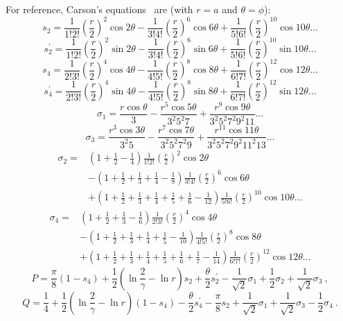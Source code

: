\documentclass[12pt,fleqn]{article}
\begin{document}
For reference, Carson's equations~\cite{Carson} are (with $r = a$ and $\theta = \phi$):
\[
   s_2 = \frac{1}{1!2!} \left(\frac{r}{2}\right)^2 \cos 2\theta
    -\frac{1}{3!4!} \left(\frac{r}{2}\right)^6 \cos 6\theta
    +\frac{1}{5!6!} \left(\frac{r}{2}\right)^{10} \cos 10\theta \ldots
\]
\[
   s_2^\prime = \frac{1}{1!2!} \left(\frac{r}{2}\right)^2 \sin 2\theta
    -\frac{1}{3!4!} \left(\frac{r}{2}\right)^6 \sin 6\theta
    +\frac{1}{5!6!} \left(\frac{r}{2}\right)^{10} \sin 10\theta \ldots
\]
\[
   s_4 = \frac{1}{2!3!} \left(\frac{r}{2}\right)^4 \cos 4\theta
    -\frac{1}{4!5!} \left(\frac{r}{2}\right)^8 \cos 8\theta
    +\frac{1}{6!7!} \left(\frac{r}{2}\right)^{12} \cos 12\theta \ldots
\]
\[
   s_4^\prime = \frac{1}{2!3!} \left(\frac{r}{2}\right)^4 \sin 4\theta
    -\frac{1}{4!5!} \left(\frac{r}{2}\right)^8 \sin 8\theta
    +\frac{1}{6!7!} \left(\frac{r}{2}\right)^{12} \sin 12\theta \ldots
\]
\[
   \sigma_1 = \frac{r \cos\theta}{3} - \frac{r^5 \cos 5\theta}{3^2 5^2 7} + \frac{r^9 \cos 9\theta}{3^2 5^2 7^2 9^2 11} \ldots
\]
\[
   \sigma_3 = \frac{r^3 \cos 3\theta}{3^2 5} - \frac{r^7 \cos 7\theta}{3^2 5^2 7^2 9} + \frac{r^{11} \cos 11\theta}{3^2 5^2 7^2 9^2 11^2 13} \ldots
\]
\begin{align*}
   \sigma_2 = & \left( 1 + \frac{1}{2} - \frac{1}{4}\right) \frac{1}{1! 2!} \left(\frac{r}{2}\right)^2 \cos 2\theta \\
   & - \left( 1 + \frac{1}{2} + \frac{1}{3} + \frac{1}{4} - \frac{1}{8}\right) \frac{1}{3! 4!} \left(\frac{r}{2}\right)^6 \cos 6\theta \\
   & + \left( 1 + \frac{1}{2} + \frac{1}{3} + \frac{1}{4} + \frac{1}{5} + \frac{1}{6} - \frac{1}{12}\right) \frac{1}{5! 6!} \left(\frac{r}{2}\right)^{10} \cos 10\theta \ldots
\end{align*}
\begin{align*}
   \sigma_4 = & \left( 1 + \frac{1}{2} + \frac{1}{3} - \frac{1}{6}\right) \frac{1}{2! 3!} \left(\frac{r}{2}\right)^4 \cos 4\theta \\
   & - \left( 1 + \frac{1}{2} + \frac{1}{3} + \frac{1}{4} + \frac{1}{5} - \frac{1}{10}\right) \frac{1}{4! 5!} \left(\frac{r}{2}\right)^8 \cos 8\theta \\
   & + \left( 1 + \frac{1}{2} + \frac{1}{3} + \frac{1}{4} + \frac{1}{5} + \frac{1}{6} + \frac{1}{7} - \frac{1}{14}\right) \frac{1}{6! 7!} \left(\frac{r}{2}\right)^{12} \cos 12\theta \ldots
\end{align*}
\[
   P = \frac{\pi}{8}\left(1 - s_4\right) + \frac{1}{2} \left(\ln\frac{2}{\gamma} - \ln r\right)s_2 + \frac{\theta}{2} s_2^\prime - \frac{1}{\sqrt{2}}\sigma_1 + \frac{1}{2}\sigma_2 + \frac{1}{\sqrt{2}}\sigma_3  \ ,
\]
\[
   Q = \frac{1}{4} + \frac{1}{2} \left(\ln\frac{2}{\gamma} - \ln r\right)\left(1 - s_4\right) - \frac{\theta}{2} s_4^\prime - \frac{\pi}{8} s_2 + \frac{1}{\sqrt{2}}\sigma_1 + \frac{1}{\sqrt{2}}\sigma_3 - \frac{1}{2}\sigma_4  \ .
\]
\end{document}
